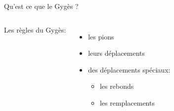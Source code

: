 \documentclass{beamer}
\begin{document}
	\begin{frame}{Qu’est ce que le Gygès ?}
		\begin{columns}
				Les règles du Gygès:

				\vspace{1em}
				\begin{itemize}
					\item<2-> les pions
					\vspace{0.75em}
					\item<3-> leurs déplacements
					\vspace{0.75em}
					\item<6-> des déplacements spéciaux:
					\begin{itemize}
						\item<7-> les rebonds
						\vspace{0.75em}
						\item<8-> les remplacements
					\end{itemize}
				\end{itemize}


\end{columns}
\end{frame}
\end{document}
